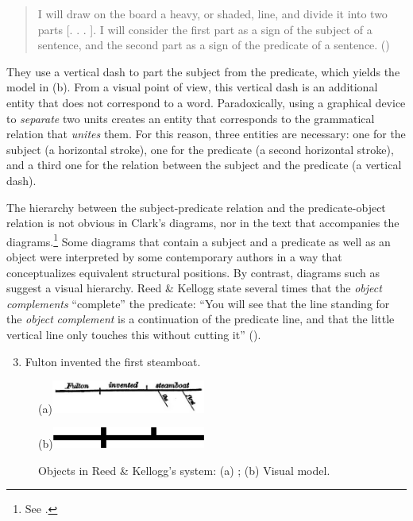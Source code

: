 \documentclass[output=paper]{langsci/langscibook}
\begin{document}
\begin{quote}
I will draw on the board a heavy, or shaded, line, and divide it into two parts [. . . ]. I will consider the first part as a sign of the subject of a sentence, and the second part as a sign of the predicate of a sentence. (\citealt[17]{reed_graded_1879})
\end{quote}

They use a vertical dash to part the subject from the predicate, which yields the model in (b). From a visual point of view, this vertical dash is an additional entity that does not correspond to a word. Paradoxically, using a graphical device to \textit{separate} two units creates an entity that corresponds to the grammatical relation that \textit{unites} them. For this reason, three entities are necessary: one for the subject (a horizontal stroke), one for the predicate (a second horizontal stroke), and a third one for the relation between the subject and the predicate (a vertical dash).

The hierarchy between the subject-predicate relation and the predicate-object relation is not obvious in Clark’s diagrams, nor in the text that accompanies the diagrams.\footnote{ \textrm{See \citet[§4.3.2]{imrenyi_how_2020}.}} Some diagrams that contain a subject and a predicate as well as an object were interpreted by some contemporary authors \citep[30]{jewell_grammatical_1867} in a way that conceptualizes equivalent structural positions. By contrast, diagrams such as  suggest a visual hierarchy. Reed \& Kellogg state several times that the \textit{object} \textit{complements} “complete” the predicate: “You will see that the line standing for the \textit{object} \textit{complement} is a continuation of the predicate line, and that the little vertical line only touches this without cutting it” (\citealt[54]{reed_graded_1879}).

\ea%
    \begin{enumerate}\setcounter{enumi}{2}
    \label{ex:key:3}
        \centering
        \item Fulton invented the first steamboat. 
    \end{enumerate}

 \begin{figure}
    
     \centering
     (a)\includegraphics[width=0.45\textwidth]{figures/04/Kap.4.img.0006a.jpg}
     
     (b)\includegraphics[width=0.45\textwidth]{figures/04/Kap.4.img.0006b.png}
     
     \caption{ Objects in Reed \& Kellogg’s system: (a) \citeyear[53]{reed_graded_1879}; (b) Visual model.}
     \label{fig:6}
     
 \end{figure}
\end{document}
